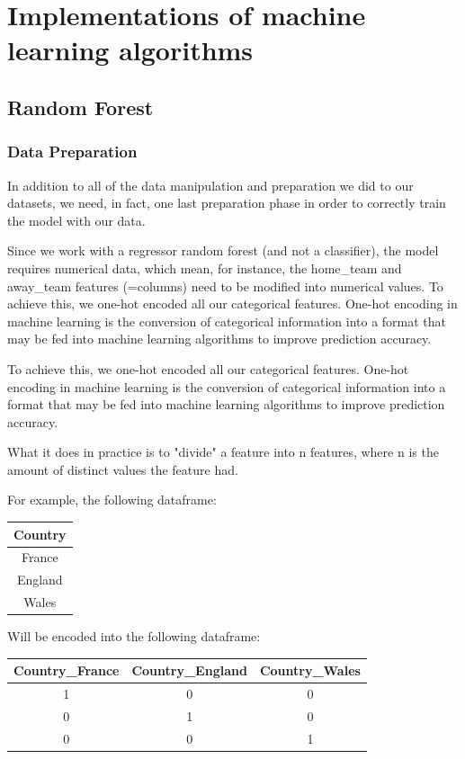 \chapter{Implementations of machine learning algorithms}

\section{Random Forest}
\subsection{Data Preparation}
In addition to all of the data manipulation and preparation we did to our datasets, we need, in fact, one last preparation phase in order to correctly train the model with our data. 

Since we work with a regressor random forest (and not a classifier), the model requires numerical data, which mean, for instance, the home\_team and away\_team features (=columns) need to be modified into numerical values.
To achieve this, we one-hot encoded all our categorical features.
One-hot encoding in machine learning is the conversion of categorical information into a format that may be fed into machine learning algorithms to improve prediction accuracy.


To achieve this, we one-hot encoded all our categorical features.
One-hot encoding in machine learning is the conversion of categorical information into a format that may be fed into machine learning algorithms to improve prediction accuracy.

What it does in practice is to "divide" a feature into n features, where n is the amount of distinct values the feature had.

For example, the following dataframe:
\begin{table}[h]
  \centering
  \begin{tabular}{|c|}
    \hline
    Country\\
    \hline
    France
     \\
    \hline
    England\\
    \hline
    Wales\\
    \hline
  \end{tabular}
  \label{tab:exemple}
\end{table}


Will be encoded into the following dataframe:\\
\begin{table}[h]
  \centering
  \begin{tabular}{|c|c|c|}
    \hline
    Country\_France & Country\_England & Country\_Wales \\
    \hline
    1 & 0 & 0 \\
    \hline
    0 & 1 & 0 \\
    \hline
    0 & 0 & 1 \\
    \hline
  \end{tabular}
  \label{tab:exemple}
\end{table}

